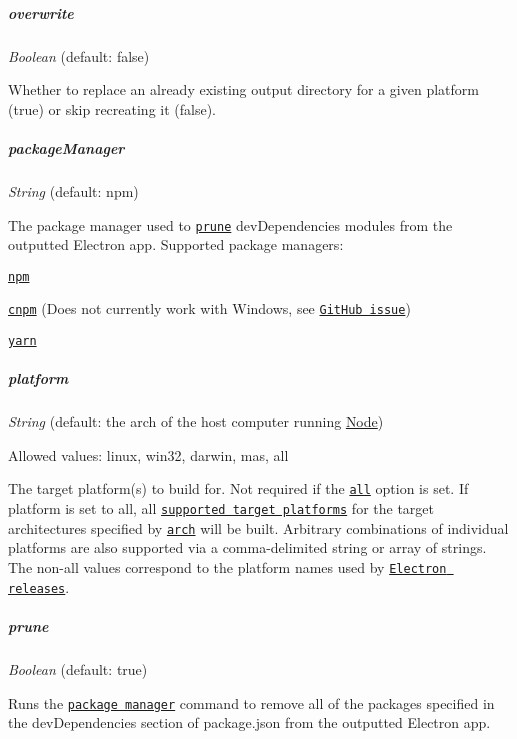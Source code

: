 \subparagraph*{{\ttfamily overwrite}}

{\itshape Boolean} (default\+: {\ttfamily false})

Whether to replace an already existing output directory for a given platform ({\ttfamily true}) or skip recreating it ({\ttfamily false}).

\subparagraph*{{\ttfamily package\+Manager}}

{\itshape String} (default\+: {\ttfamily npm})

The package manager used to \href{#prune}{\tt prune} {\ttfamily dev\+Dependencies} modules from the outputted Electron app. Supported package managers\+:


\begin{DoxyItemize}
\item \href{https://npmjs.com/}{\tt {\ttfamily npm}}
\item \href{https://github.com/cnpm/cnpm}{\tt {\ttfamily cnpm}} (Does not currently work with Windows, see \href{https://github.com/electron-userland/electron-packager/issues/515#issuecomment-297604044}{\tt Git\+Hub issue})
\item \href{https://yarnpkg.com/}{\tt {\ttfamily yarn}}
\end{DoxyItemize}

\subparagraph*{{\ttfamily platform}}

{\itshape String} (default\+: the arch of the host computer running \mbox{\hyperlink{classNode}{Node}})

Allowed values\+: {\ttfamily linux}, {\ttfamily win32}, {\ttfamily darwin}, {\ttfamily mas}, {\ttfamily all}

The target platform(s) to build for. Not required if the \href{#all}{\tt {\ttfamily all}} option is set. If {\ttfamily platform} is set to {\ttfamily all}, all \href{#supported-platforms}{\tt supported target platforms} for the target architectures specified by \href{#arch}{\tt {\ttfamily arch}} will be built. Arbitrary combinations of individual platforms are also supported via a comma-\/delimited string or array of strings. The non-\/{\ttfamily all} values correspond to the platform names used by \href{https://github.com/electron/electron/releases}{\tt Electron releases}.

\subparagraph*{{\ttfamily prune}}

{\itshape Boolean} (default\+: {\ttfamily true})

Runs the \href{#packagemanager}{\tt package manager} command to remove all of the packages specified in the {\ttfamily dev\+Dependencies} section of {\ttfamily package.\+json} from the outputted Electron app.

